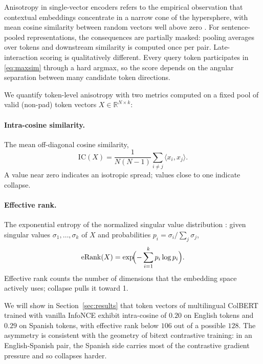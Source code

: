 Anisotropy in single-vector encoders refers to the empirical observation that contextual embeddings concentrate in a narrow cone of the hypersphere, with mean cosine similarity between random vectors well above zero \citep{ethayarajh2019contextual,gao2019representation,mu2018allbutthetop}. For sentence-pooled representations, the consequences are partially masked: pooling averages over tokens and downstream similarity is computed once per pair. Late-interaction scoring is qualitatively different. Every query token participates in \eqref{eq:maxsim} through a hard argmax, so the score depends on the angular separation between many candidate token directions.

We quantify token-level anisotropy with two metrics computed on a fixed pool of valid (non-pad) token vectors $X \in \mathbb{R}^{N \times k}$:

\paragraph{Intra-cosine similarity.} The mean off-diagonal cosine similarity,
\begin{equation}
\label{eq:intracos}
\mathrm{IC}(X) = \frac{1}{N(N-1)} \sum_{i \ne j} \langle x_i, x_j \rangle.
\end{equation}
A value near zero indicates an isotropic spread; values close to one indicate collapse.

\paragraph{Effective rank.} The exponential entropy of the normalized singular value distribution \citep{wang2020understanding}: given singular values $\sigma_1, \ldots, \sigma_k$ of $X$ and probabilities $p_i = \sigma_i / \sum_j \sigma_j$,
\begin{equation}
\label{eq:erank}
\mathrm{eRank}(X) = \exp\!\Bigl( - \sum_{i=1}^{k} p_i \log p_i \Bigr).
\end{equation}
Effective rank counts the number of dimensions that the embedding space actively uses; collapse pulls it toward 1.

We will show in Section~\ref{sec:results} that token vectors of multilingual ColBERT trained with vanilla InfoNCE exhibit intra-cosine of $0.20$ on English tokens and $0.29$ on Spanish tokens, with effective rank below $106$ out of a possible $128$. The asymmetry is consistent with the geometry of bitext contrastive training: in an English-Spanish pair, the Spanish side carries most of the contrastive gradient pressure and so collapses harder.

